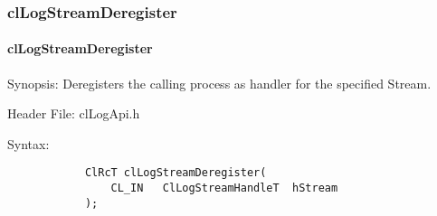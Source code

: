 \begin{flushleft}
\subsubsection{clLogStreamDeregister}
\hypertarget{pagelog115}{}\paragraph{cl\-Log\-Stream\-Deregister}\label{pagelog115}
\begin{Desc}
\item[Synopsis:] Deregisters the calling process as handler for the specified Stream.\end{Desc}
\begin{Desc}
\item[Header File:] clLogApi.h \end{Desc}
\begin{Desc}
\item[Syntax:]
\footnotesize\begin{verbatim}        	
			ClRcT clLogStreamDeregister(
				CL_IN	ClLogStreamHandleT	hStream
			);


\end{verbatim}
\end{Desc}
\end{flushleft}
